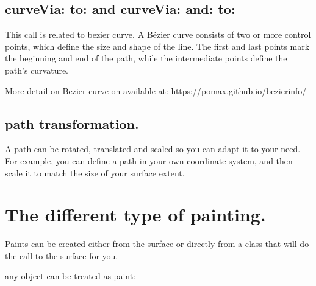 \documentclass[10pt,twoside,english]{_support/latex/sbabook/sbabook}
\begin{document}
\subsection{curveVia: to: and \textbar{}curveVia: and: to:}
This call is related to bezier curve. A B\'{e}zier curve consists of two or more
control points, which define the size and shape of the line. The first and
last points mark the beginning and end of the path, while the intermediate
points define the path's curvature.

More detail on Bezier curve on available at: https://pomax.github.io/bezierinfo/

\subsection{path transformation.}
A path can be rotated, translated and scaled so you can adapt it to your need.
For example, you can define a path in your own coordinate system, and then
scale it to match the size of your surface extent.

\section{The different type of painting.}
Paints can be created either from the surface or directly from a class that will
do the call to the surface for you.

any object can be treated as paint:
- 
- 
- 
\end{document}
